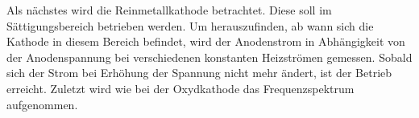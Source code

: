 Als nächstes wird die Reinmetallkathode betrachtet. Diese soll im
Sättigungsbereich betrieben werden. Um herauszufinden, ab wann sich die Kathode
in diesem Bereich befindet, wird der Anodenstrom in Abhängigkeit von der
Anodenspannung bei verschiedenen konstanten Heizströmen gemessen. Sobald sich
der Strom bei Erhöhung der Spannung nicht mehr ändert, ist der Betrieb erreicht.
Zuletzt wird wie bei der Oxydkathode das Frequenzspektrum aufgenommen.

